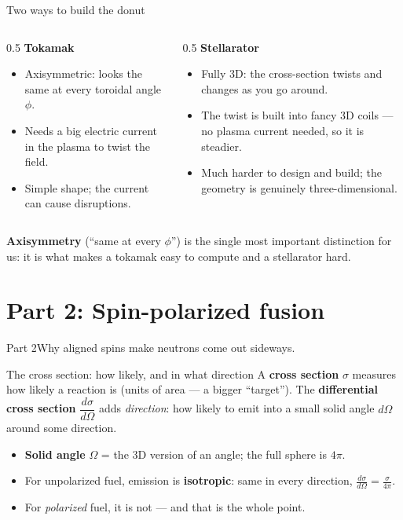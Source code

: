\documentclass[11pt,aspectratio=169]{beamer}
\newcommand{\key}[1]{\textcolor{key}{\textbf{#1}}}
\begin{document}
\begin{frame}{Two ways to build the donut}
\begin{columns}
\begin{column}{0.5\textwidth}
\key{Tokamak}
\begin{itemize}\footnotesize
\item Axisymmetric: looks the same at every toroidal angle $\phi$.
\item Needs a big electric current in the plasma to twist the field.
\item Simple shape; the current can cause disruptions.
\end{itemize}
\end{column}
\begin{column}{0.5\textwidth}
\key{Stellarator}
\begin{itemize}\footnotesize
\item Fully 3D: the cross-section twists and changes as you go around.
\item The twist is built into fancy 3D coils --- no plasma current needed, so it is steadier.
\item Much harder to design and build; the geometry is genuinely three-dimensional.
\end{itemize}
\end{column}
\end{columns}
\vfill
\key{Axisymmetry} (``same at every $\phi$'') is the single most important distinction for us:
it is what makes a tokamak easy to compute and a stellarator hard.
\end{frame}

\section{Part 2: Spin-polarized fusion}
\begin{frame}{Part 2}\Large Why aligned spins make neutrons come out sideways.\end{frame}

\begin{frame}{The cross section: how likely, and in what direction}
A \key{cross section} $\sigma$ measures how likely a reaction is (units of area --- a bigger
``target''). The \key{differential cross section} $\dfrac{d\sigma}{d\Omega}$ adds
\emph{direction}: how likely to emit into a small solid angle $d\Omega$ around some
direction.
\begin{itemize}
\item \key{Solid angle} $\Omega$ = the 3D version of an angle; the full sphere is $4\pi$.
\item For unpolarized fuel, emission is \key{isotropic}: same in every direction,
$\frac{d\sigma}{d\Omega}=\frac{\sigma}{4\pi}$.
\item For \emph{polarized} fuel, it is not --- and that is the whole point.
\end{itemize}
\end{frame}
\end{document}
